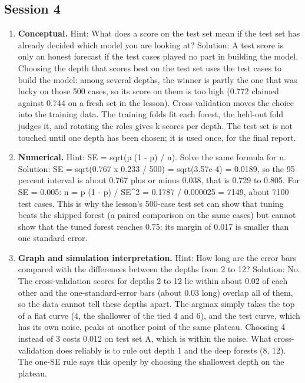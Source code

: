 \documentclass[11pt,a4paper]{article}
\begin{document}
\subsection*{Session 4}
\begin{enumerate}[nosep]
\item \textbf{Conceptual.} Hint: What does a score on the test set mean if the test set has already decided which model you are looking at? Solution: A test score is only an honest forecast if the test cases played no part in building the model. Choosing the depth that scores best on the test set uses the test cases to build the model: among several depths, the winner is partly the one that was lucky on those 500 cases, so its score on them is too high (0.772 claimed against 0.744 on a fresh set in the lesson). Cross-validation moves the choice into the training data. The training folds fit each forest, the held-out fold judges it, and rotating the roles gives k scores per depth. The test set is not touched until one depth has been chosen; it is used once, for the final report.
\item \textbf{Numerical.} Hint: SE = sqrt(p (1 - p) / n). Solve the same formula for n. Solution: SE = sqrt(0.767 x 0.233 / 500) = sqrt(3.57e-4) = 0.0189, so the 95 percent interval is about 0.767 plus or minus 0.038, that is 0.729 to 0.805. For SE = 0.005: n = p (1 - p) / SE\textasciicircum{}2 = 0.1787 / 0.000025 = 7149, about 7100 test cases. This is why the lesson's 500-case test set can show that tuning beats the shipped forest (a paired comparison on the same cases) but cannot show that the tuned forest reaches 0.75: its margin of 0.017 is smaller than one standard error.
\item \textbf{Graph and simulation interpretation.} Hint: How long are the error bars compared with the differences between the depths from 2 to 12? Solution: No. The cross-validation scores for depths 2 to 12 lie within about 0.02 of each other and the one-standard-error bars (about 0.03 long) overlap all of them, so the data cannot tell these depths apart. The argmax simply takes the top of a flat curve (4, the shallower of the tied 4 and 6), and the test curve, which has its own noise, peaks at another point of the same plateau. Choosing 4 instead of 3 costs 0.012 on test set A, which is within the noise. What cross-validation does reliably is to rule out depth 1 and the deep forests (8, 12). The one-SE rule says this openly by choosing the shallowest depth on the plateau.

\end{enumerate}
\end{document}
